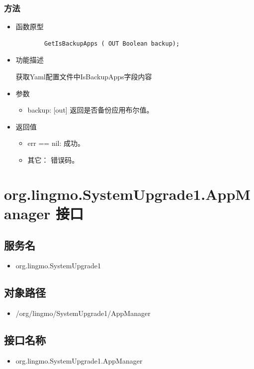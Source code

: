 \documentclass{utart}
\begin{document}
\subsubsection{方法}
\begin{itemize}
    \item 函数原型
    
    \begin{verbatim}
        GetIsBackupApps ( OUT Boolean backup);
      \end{verbatim}
    \item 功能描述
    
    获取Yaml配置文件中IsBackupApps字段内容
    \item 参数
      \begin{itemize}
          \item backup: [out] 返回是否备份应用布尔值。
      \end{itemize}
    \item 返回值
      \begin{itemize}
          \item err == nil: 成功。
          \item 其它： 错误码。
      \end{itemize}
\end{itemize}


\section{org.lingmo.SystemUpgrade1.AppManager 接口}
\subsection{服务名}
\begin{itemize}
    \item org.lingmo.SystemUpgrade1
\end{itemize}

\subsection{对象路径}
\begin{itemize}
    \item /org/lingmo/SystemUpgrade1/AppManager
\end{itemize}

\subsection{接口名称}
\begin{itemize}
    \item org.lingmo.SystemUpgrade1.AppManager
\end{itemize}
\end{document}
